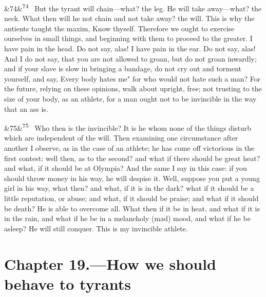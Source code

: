 \documentclass[12pt]{article}
\newcommand{\para}[1][]{\par\noindent\ifx&#1&\else\textsuperscript{\footnotesize #1}~\fi}
\begin{document}
\para[74] But the tyrant will chain—what? the leg. He will take away—what? the neck. What then will he not chain and not take away? the will. This is why the antients taught the maxim, Know thyself. Therefore we ought to exercise ourselves in small things, and beginning with them to proceed to the greater. I have pain in the head. Do not say, alas! I have pain in the ear. Do not say, alas! And I do not say, that you are not allowed to groan, but do not groan inwardly; and if your slave is slow in bringing a bandage, do not cry out and torment yourself, and say, Every body hates me" for who would not hate such a man? For the future, relying on these opinions, walk about upright, free; not trusting to the size of your body, as an athlete, for a man ought not to be invincible in the way that an ass is.

\para[75] Who then is the invincible? It is he whom none of the things disturb which are independent of the will. Then examining one circumstance after another I observe, as in the case of an athlete; he has come off victorious in the first contest: well then, as to the second? and what if there should be great heat? and what, if it should be at Olympia? And the same I say in this case: if you should throw money in his way, he will despise it. Well, suppose you put a young girl in his way, what then? and what, if it is in the dark? what if it should be a little reputation, or abuse; and what, if it should be praise; and what if it should be death? He is able to overcome all. What then if it be in heat, and what if it is in the rain, and what if he be in a melancholy (mad) mood, and what if he be asleep? He will still conquer. This is my invincible athlete.

\section*{Chapter 19.---How we should behave to tyrants}
\end{document}
